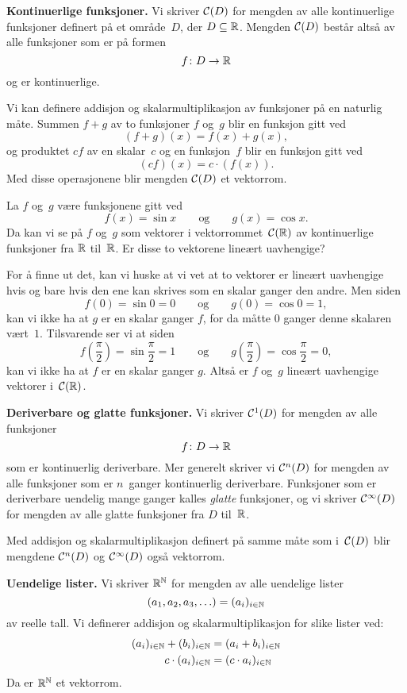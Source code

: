 \medskip\noindent\textbf{Kontinuerlige funksjoner. }%
Vi skriver $\mathcal{C}(D)$ for mengden av alle kontinuerlige funksjoner
definert på et område~$D$, der $D \subseteq \mathbb{R}$.  Mengden $\mathcal{C}(D)$
består altså av alle funksjoner som er på formen
\[
f \colon D \to \mathbb{R}
\]
og er kontinuerlige.

Vi kan definere addisjon og skalarmultiplikasjon av funksjoner på en
naturlig måte.  Summen $f + g$ av to funksjoner $f$ og~$g$ blir en
funksjon gitt ved
\[
(f + g)(x) = f(x) + g(x),
\]
og produktet $cf$ av en skalar~$c$ og en funksjon~$f$ blir en funksjon
gitt ved
\[
(cf)(x) = c \cdot (f(x)).
\]
Med disse operasjonene blir mengden $\mathcal{C}(D)$ et vektorrom.

\begin{ex}
\label{ex:sin-cos-lin-uavh}
La $f$ og~$g$ være funksjonene gitt ved
\[
f(x) = \sin x
\qquad\text{og}\qquad
g(x) = \cos x.
\]
Da kan vi se på $f$ og~$g$ som vektorer i vektorrommet~$\mathcal{C}(\mathbb{R})$ av
kontinuerlige funksjoner fra $\mathbb{R}$ til~$\mathbb{R}$.  Er disse to vektorene
lineært uavhengige?

For å finne ut det, kan vi huske at vi vet at to vektorer er lineært
uavhengige hvis og bare hvis den ene kan skrives som en skalar ganger
den andre.  Men siden
\[
f(0) = \sin 0 = 0
\qquad\text{og}\qquad
g(0) = \cos 0 = 1,
\]
kan vi ikke ha at $g$ er en skalar ganger $f$, for da måtte $0$ ganger
denne skalaren vært~$1$.  Tilsvarende ser vi at siden
\[
f\left(\frac{\pi}{2}\right) = \sin \frac{\pi}{2} = 1
\qquad\text{og}\qquad
g\left(\frac{\pi}{2}\right) = \cos \frac{\pi}{2} = 0,
\]
kan vi ikke ha at $f$ er en skalar ganger $g$.  Altså er $f$ og~$g$
lineært uavhengige vektorer i~$\mathcal{C}(\mathbb{R})$.
\end{ex}

\medskip\noindent\textbf{Deriverbare og glatte funksjoner. }%
Vi skriver $\mathcal{C}^1(D)$ for mengden av alle funksjoner
\[
f \colon D \to \mathbb{R}
\]
som er kontinuerlig deriverbare.
Mer generelt skriver vi $\mathcal{C}^n(D)$ for mengden av alle funksjoner som
er $n$~ganger kontinuerlig deriverbare.
Funksjoner som er
deriverbare uendelig mange ganger kalles \emph{glatte} funksjoner, og
vi skriver $\mathcal{C}^\infty(D)$ for mengden av alle glatte funksjoner fra
$D$ til~$\mathbb{R}$.

Med addisjon og skalarmultiplikasjon definert på samme måte som
i~$\mathcal{C}(D)$ blir mengdene $\mathcal{C}^n(D)$ og $\mathcal{C}^\infty(D)$ også vektorrom.

\medskip\noindent\textbf{Uendelige lister. }%
Vi skriver $\mathbb{R}^{\mathbb{N}}$ for mengden av alle uendelige lister
\[
(a_1, a_2, a_3, \ldots) = (a_i)_{i \in \mathbb{N}}
\]
av reelle tall.  Vi definerer addisjon og skalarmultiplikasjon for
slike lister ved:
\begin{align*}
(a_i)_{i \in \mathbb{N}} + (b_i)_{i \in \mathbb{N}} &= (a_i + b_i)_{i \in \mathbb{N}} \\
c \cdot (a_i)_{i \in \mathbb{N}} &= (c \cdot a_i)_{i \in \mathbb{N}}
\end{align*}
Da er $\mathbb{R}^{\mathbb{N}}$ et vektorrom.

